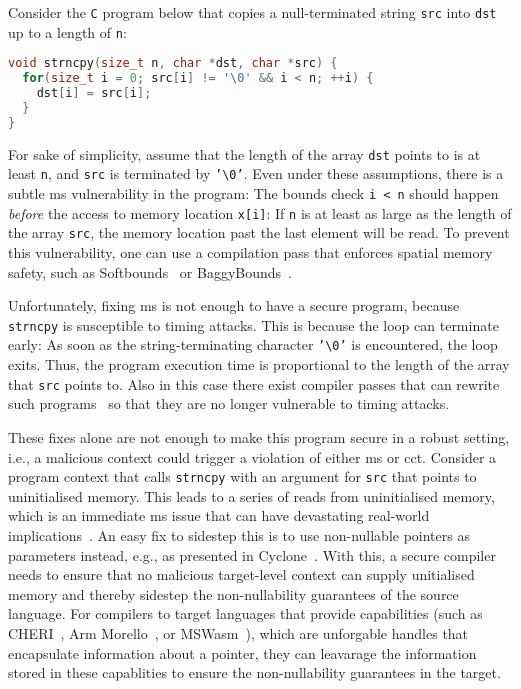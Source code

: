 \documentclass[utf8,acmsmall,review,screen,dvipsnames,anonymous]{acmart}
\begin{document}
\begin{example}[strncpy]\label{ex:strncpy}
Consider the \texttt{C} program below that copies a null-terminated string \texttt{src} into \texttt{dst} up to a length of \texttt{n}:

\begin{lstlisting}[language=c,basicstyle=\small\ttfamily,morekeywords={size_t}]
void strncpy(size_t n, char *dst, char *src) {
  for(size_t i = 0; src[i] != '\0' && i < n; ++i) {
    dst[i] = src[i];
  }
}
\end{lstlisting}

For sake of simplicity, assume that the length of the array \texttt{dst} points to is at least \texttt{n}, and \texttt{src} is terminated by \texttt{'\textbackslash 0'}.
Even under these assumptions, there is a subtle \gls{ms} vulnerability in the program: The bounds check \texttt{i < n} should happen {\it before} the access to memory location \texttt{x[i]}:
If \texttt{n} is at least as large as the length of the array \texttt{src}, the memory location past the last element will be read.
To prevent this vulnerability, one can use a compilation pass that enforces spatial memory safety, such as Softbounds~\cite{nagarakatte2009soft} or BaggyBounds~\cite{akritidis2009baggy}.

Unfortunately, fixing \gls{ms} is not enough to have a secure program, because \texttt{strncpy} is susceptible to timing attacks.
This is because the loop can terminate early: As soon as the string-terminating character \texttt{'\textbackslash 0'} is encountered, the loop exits.
Thus, the program execution time is proportional to the length of the array that \texttt{src} points to.
Also in this case there exist compiler passes that can rewrite such programs~\cite{cauligi2019fact} so that they are no longer vulnerable to timing attacks.

These fixes alone are not enough to make this program secure in a robust setting, i.e., a malicious context could trigger a violation of either \gls{ms} or \gls{cct}.
Consider a program context that calls \texttt{strncpy} with an argument for \texttt{src} that points to uninitialised memory.
This leads to a series of reads from uninitialised memory, which is an immediate \gls{ms} issue that can have devastating real-world implications~\cite{uninit-0,uninit-1,uninit-2,uninit-3,uninit-4}.
An easy fix to sidestep this is to use non-nullable pointers as parameters instead, e.g., as presented in Cyclone~\cite{jim2002cyclone}.
With this, a secure compiler needs to ensure that no malicious target-level context can supply unitialised memory and thereby sidestep the non-nullability guarantees of the source language.
For compilers to target languages that provide capabilities (such as CHERI~\cite{woodruff2014CHERI}, Arm Morello~\cite{arm-morello}, or MSWasm~\cite{michael2023mswasm}), which are unforgable handles that encapsulate information about a pointer, they can leavarage the information stored in these capablities to ensure the non-nullability guarantees in the target.
\end{example}
\end{document}
